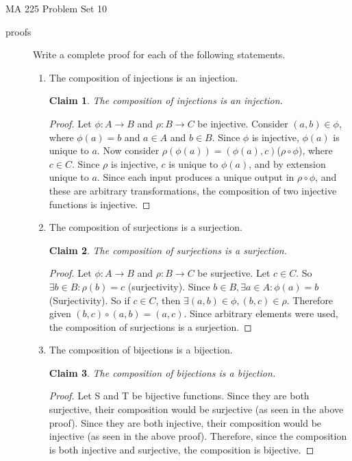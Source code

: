 \documentclass[11pt]{letter}
\newtheorem{claim}{Claim}
\theoremstyle{definition}
\begin{document}
\pagestyle{empty}

{\Large MA 225 Problem Set 10}\\


\begin{description}

	

\item[proofs] Write a complete proof for each of the following statements.
	\begin{enumerate}
        \item The composition of injections is an injection.
          \begin{claim}
            The composition of injections is an injection.
          \end{claim}
          \begin{proof}
  Let $\phi: A\rightarrow B$ and $\rho: B\rightarrow C$ be injective. Consider $(a,b)\in \phi$, where $\phi(a)=b$ and $a\in A$ and $b\in B$. Since $\phi$ is injective, $\phi(a)$ is unique to $a$. Now consider $\rho(\phi(a))=(\phi(a),c)$($\rho\circ\phi$), where $c\in C$. Since $\rho$ is injective, $c$ is unique to $\phi(a)$, and by extension unique to $a$. Since each input produces a unique output in $\rho\circ\phi$, and these are arbitrary transformations, the composition of two injective functions is injective.
\end{proof}


\item The composition of surjections is a surjection.
  \begin{claim}
    The composition of surjections is a surjection.
  \end{claim}
  \begin{proof}
    Let $\phi: A\rightarrow B$ and $\rho: B\rightarrow C$ be surjective. Let $c\in C$.  So $\exists b\in B: \rho(b)=c$ (surjectivity). Since $b\in B, \exists a\in A: \phi(a)=b$ (Surjectivity). So  if $c\in C$, then $\exists (a,b)\in \phi,(b,c)\in\rho$. Therefore given $(b,c)\circ(a,b)=(a,c)$. Since arbitrary elements were used, the composition of surjections is a surjection.
  \end{proof}
  
\item The composition of bijections is a bijection.
  \begin{claim}
    The composition of bijections is a bijection.
  \end{claim}
  \begin{proof}
    Let S and T be bijective functions. Since they are both surjective, their composition would be surjective (as seen in the above proof). Since they are both injective, their composition would be injective (as seen in the above proof). Therefore, since the composition is both injective and surjective, the composition is bijective.
\end{proof}


\end{enumerate}
\end{description}
\end{document}
